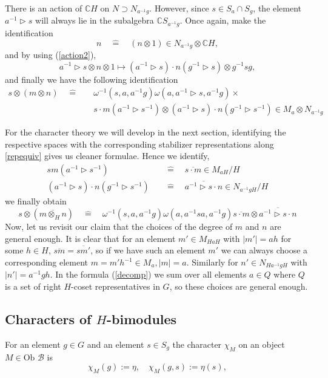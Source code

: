 \documentclass[11pt]{book}
\theoremstyle{Rem}
\theoremstyle{definition}
\numberwithin{equation}{section}
\newcommand\identify{\quad\hat{=}\quad}
\newcommand\hit{\triangleright}
\newcommand\inv{^{-1}}
\newcommand\CC{\mathbb C}
\newcommand\B{\mathcal B}
\begin{document}
There is an action of $\CC H$ on $N \supset N_{a\inv g}$. However, since $s\in S_a\cap S_g$, the element $a\inv \hit s$ will always lie in the subalgebra $\CC S_{a\inv g}$. Once again, make the identification \begin{equation}
	n \identify (n\otimes 1) \in N_{a\inv g} \otimes \CC H,
\end{equation}  and by using (\ref{action2}),  \begin{equation}
	a\inv \hit s \otimes n\otimes 1 \mapsto  (a\inv \hit s)\cdot n (g\inv\hit s) \otimes g\inv sg,
\end{equation} and finally we have the following identification \begin{align}
s\otimes (m\otimes n) \identify&  \omega\inv (s, a, a\inv g)\omega (a, a\inv \hit s, a\inv g)\times \\&s\cdot m (a\inv\hit  s\inv) \otimes (a\inv \hit s)\cdot n (g\inv\hit s\inv) \in M_a\otimes N_{a\inv g}\nonumber 
\end{align}

For the character theory we will develop in the next section, identifying the respective spaces with the corresponding stabilizer representations along \ref{repequiv} gives us cleaner formulae. Hence we identify, \begin{align}
	sm (a\inv\hit s\inv)  &\identify \overline{s\cdot m} \in M_{aH}/H\\
	(a\inv\hit s)\cdot n(g\inv \hit s\inv) &\identify \overline{a\inv \hit s\cdot n} \in N_{a\inv g H} /H
\end{align}
we finally obtain \begin{equation}
	s\otimes (\overline{m\otimes_H n}) \identify \omega\inv (s, a, a\inv g)\omega (a, a\inv sa, a\inv g)\overline{s\cdot m} \otimes \overline{a\inv \hit s\cdot n} \label{mainaction}
\end{equation}
Now, let us revisit our claim that the choices of the degree of $m$ and $n$ are general enough. It is clear that for an element $m'\in M_{HaH}$ with $|m'| = ah$ for some $h\in H$, $\overline{sm} = \overline{sm'}$, so if we have such an element $m'$ we can always choose a corresponding element $m=m'h\inv \in M_a, |m| = a$. Similarly for $n' \in N_{Ha\inv g H}$ with $|n'| = a\inv gh$. In the formula (\ref{decomp}) we sum over all elements $a\in Q$ where $Q$ is a set of right $H$-coset representatives in $G$, so these choices are general enough.

\subsection{Characters of $H$-bimodules}
For an element $g \in G$ and an element $s\in S_g$ the character $\chi_M$ on an object $M\in \text{Ob }\B$ is \begin{equation}\chi_{M}(g) := \eta, \quad\chi_{M}(g,s) := \eta(s),\label{bimodulechar}
\end{equation} 
\end{document}
